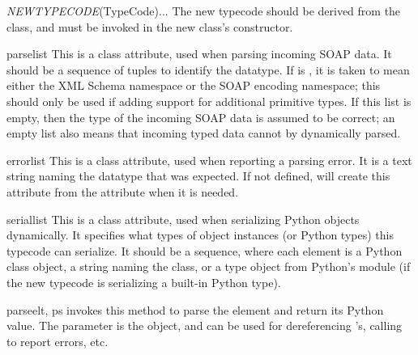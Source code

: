 \begin{classdesc}{\emph{NEWTYPECODE}(TypeCode)}{...}
The new typecode should be derived from the  class, and
 must be invoked in the new class's constructor.
\end{classdesc}

\begin{memberdesc}{parselist}
This is a class attribute, used when parsing incoming SOAP data.
It should be a sequence of  tuples to identify
the datatype.
If  is , it is taken to mean either the XML Schema
namespace or the SOAP encoding namespace;
this should only be used if adding support for additional primitive types.
If this list is empty, then the type of the incoming SOAP data is assumed
to be correct; an empty list also means that incoming typed data cannot
by dynamically parsed.
\end{memberdesc}

\begin{memberdesc}{errorlist}
This is a class attribute, used when reporting a parsing error.
It is a text string naming the datatype that was expected.
If not defined, \ZSI{} will create this attribute from the 
attribute when it is needed.
\end{memberdesc}

\begin{memberdesc}{seriallist}
This is a class attribute, used when serializing Python objects
dynamically.
It specifies what types of object instances (or Python types) this
typecode can serialize.
It should be a sequence, where each element is a Python class object,
a string naming the class, or a type object from Python's 
module (if the
new typecode is serializing a built-in Python type).
\end{memberdesc}

\begin{methoddesc}{parse}{elt, ps}
\ZSI{} invokes this method to
parse the  element and return its Python value.
The  parameter is the  object, and can be
used for dereferencing 's, calling  to
report errors, etc.
\end{methoddesc}

